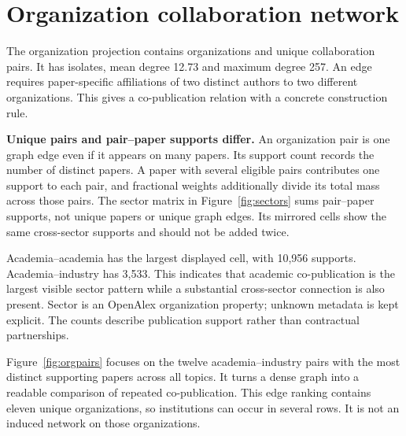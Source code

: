 \section{Organization collaboration network}
The organization projection contains \Organizations{} organizations and
\OrganizationPairs{} unique collaboration pairs. It has
\OrganizationIsolates{} isolates, mean degree 12.73 and maximum degree 257.
An edge requires paper-specific affiliations of two distinct authors to two
different organizations. This gives a co-publication relation with a concrete
construction rule.

\textbf{Unique pairs and pair--paper supports differ.} An organization pair is
one graph edge even if it appears on many papers. Its support count records the
number of distinct papers. A paper with several eligible pairs contributes one
support to each pair, and fractional weights additionally divide its total mass
across those pairs. The sector matrix in Figure~\ref{fig:sectors} sums
pair--paper supports, not unique papers or unique graph edges. Its mirrored
cells show the same cross-sector supports and should not be added twice.

\FloatBarrier

Academia--academia has the largest displayed cell, with 10,956 supports.
Academia--industry has 3,533. This indicates that academic co-publication is the
largest visible sector pattern while a substantial cross-sector connection is
also present. Sector is an OpenAlex organization property; unknown metadata is
kept explicit. The counts describe publication support rather than contractual
partnerships.

\Needspace{17cm}
Figure~\ref{fig:orgpairs} focuses on the twelve academia--industry pairs with the
most distinct supporting papers across all topics. It turns a dense graph into
a readable comparison of repeated co-publication. This edge ranking contains
eleven unique organizations, so institutions can occur in several rows. It is
not an induced network on those organizations.

\FloatBarrier

